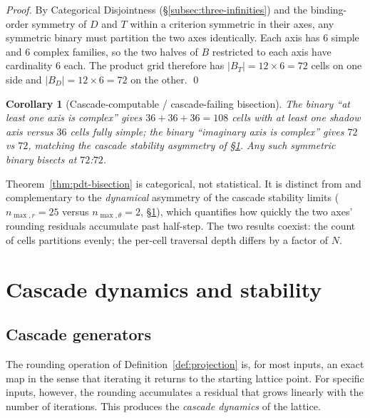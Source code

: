 \documentclass[11pt,a4paper]{article}
\newtheorem{corollary}[theorem]{Corollary}
\theoremstyle{definition}
\theoremstyle{remark}
\begin{document}
\begin{proof}
By Categorical Disjointness (\S\ref{subsec:three-infinities}) and the binding-order symmetry of $D$ and $T$ within a criterion symmetric in their axes, any symmetric binary must partition the two axes identically. Each axis has $6$ simple and $6$ complex families, so the two halves of $B$ restricted to each axis have cardinality $6$ each. The product grid therefore has $|B_{T}| = 12 \times 6 = 72$ cells on one side and $|B_{D}| = 12\times 6 = 72$ on the other.
\qed
\end{proof}

\begin{corollary}[Cascade-computable / cascade-failing bisection]\label{cor:bisection}
The binary ``at least one axis is complex'' gives $36+36+36 = 108$ cells with at least one shadow axis versus $36$ cells fully simple; the binary ``imaginary axis is complex'' gives $72$ vs $72$, matching the cascade stability asymmetry of \S\ref{sec:cascade}. Any such symmetric binary bisects at $72$:$72$.
\end{corollary}

Theorem~\ref{thm:pdt-bisection} is categorical, not statistical. It is distinct from and complementary to the \emph{dynamical} asymmetry of the cascade stability limits ($n_{\max,r} = 25$ versus $n_{\max,\theta} = 2$, \S\ref{sec:cascade}), which quantifies how quickly the two axes' rounding residuals accumulate past half-step. The two results coexist: the count of cells partitions evenly; the per-cell traversal depth differs by a factor of $N$.

\section{Cascade dynamics and stability}\label{sec:cascade}

\subsection{Cascade generators}

The rounding operation of Definition~\ref{def:projection} is, for most inputs, an exact map in the sense that iterating it returns to the starting lattice point. For specific inputs, however, the rounding accumulates a residual that grows linearly with the number of iterations. This produces the \emph{cascade dynamics} of the lattice.
\end{document}
